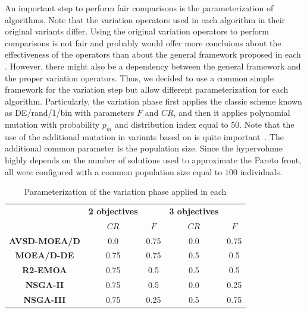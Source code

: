 An important step to perform fair comparisons is the parameterization of algorithms.
%
Note that the variation operators used in each algorithm in their original variants differ.
%
Using the original variation operators to perform comparisons is not fair and probably would offer more concluions 
about the effectiveness of the operators than about the general framework proposed in each \MOEA{}.
%
However, there might also be a dependency between the general framework and the proper variation operators.
%
Thus, we decided to use a common simple framework for the variation step but allow different parameterization
for each algorithm.
%
Particularly, the variation phase first applies the classic \DE{} scheme known as DE/rand/1/bin with parameters $F$
and $CR$, and then it applies polynomial mutation with probability $p_m$
and distribution index equal to $50$.
%
Note that the use of the additional mutation in variants based on \MOEAD{} is quite important~\cite{zhang2009performance}.
%
The additional common parameter is the population size.
%
Since the hypervolume highly depends on the number of solutions used to approximate the Pareto front,
all \MOEAS{} were configured with a common population size equal to $100$ individuals.
\begin{table}[t]
\centering
\caption{Parameterization of the variation phase applied in each \MOEA{}}
\label{tab:tunning}
\begin{tabular}{c|c|c|c|c}
\hline
\multirow{2}{*}{} & \textbf{2 objectives} & \textbf{} & \textbf{3 objectives} &  \\ \cline{2-5} 
 & $CR$ & $F$ & $CR$ & $F$ \\ \hline
\textbf{AVSD-MOEA/D} & 0.0 & 0.75 & 0.0 & 0.75 \\ \hline
\textbf{MOEA/D-DE} & 0.75 & 0.75 & 0.5 & 0.5 \\ \hline
\textbf{R2-EMOA} & 0.75 & 0.5 & 0.5 & 0.5 \\ \hline
\textbf{NSGA-II} & 0.75 & 0.5 & 0.0 & 0.25 \\ \hline
\textbf{NSGA-III} & 0.75 & 0.25 & 0.5 & 0.75 \\ \hline
\end{tabular}%
\end{table}

